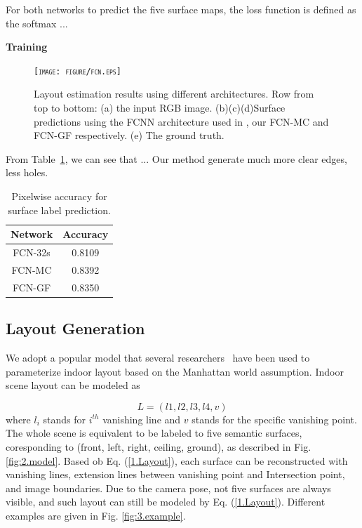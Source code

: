 For both networks to predict the five surface maps, the loss function is defined as the softmax ...


\textbf{Training}

\begin{figure}[!htq]
	\centering 
	\textsc{\texttt{[image: figure/fcn.eps]}}
	\caption{Layout estimation results using different architectures. Row from top to bottom: (a) the input RGB image. (b)(c)(d)Surface predictions using the FCNN architecture used in \cite{dasgupta2016delay,ren2016coarse}, our FCN-MC and FCN-GF respectively. (e) The ground truth. }
	\label{fig:fcn-comparison}
\end{figure}

From Table~\ref{table:fcn-accuracy}, we can see that ...
Our method generate much more clear edges, less holes. 


\begin{table}
	\centering
	\caption{Pixelwise accuracy for surface label prediction.}
	\label{table:fcn-accuracy}
	\begin{tabular}{c|c}
		\hline
	Network & Accuracy\\
	\hline
	FCN-32s & 0.8109 \\ 
	FCN-MC  & 0.8392 \\
	FCN-GF  & 0.8350 \\
		\hline
	\end{tabular}
		
\end{table}







\subsection{Layout Generation}
\label{subsection:optimization}
We adopt a popular model that several  researchers~\cite{hedau2009recovering,dasgupta2016delay,ren2016coarse} have been used to parameterize indoor layout based on the Manhattan world assumption. 
Indoor scene layout can be modeled as 

\begin{equation}
	\label{eq:Layout}
	L = (l1, l2, l3, l4, v)
\end{equation}
where $l_{i}$ stands for $i^{th}$ vanishing line and $v$ stands for the specific vanishing point. The whole scene is equivalent to be labeled to five semantic surfaces, coresponding to (front, left, right, ceiling, ground), as described in Fig. \ref{fig:2.model}. Based ob Eq. (\ref{1.Layout}), each surface can be reconstructed with vanishing lines, extension lines between vanishing point and Intersection point, and image boundaries. Due to the camera pose, not five surfaces are always visible, and such layout can still be modeled by Eq. (\ref{1.Layout}). Different examples are given in Fig. \ref{fig:3.example}.
